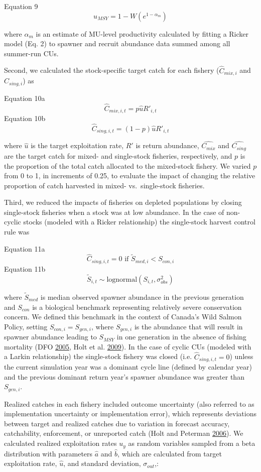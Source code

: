 \documentclass[11pt]{book}
\begin{document}
Equation 9 \[ {u}_{MSY} = 1 - W(e^{1 - \alpha_m})\]

where \(\alpha_m\) is an estimate of MU-level productivity calculated by fitting a Ricker model (Eq. 2) to spawner and recruit abundance data summed among all summer-run CUs.

Second, we calculated the stock-specific target catch for each fishery (\(\hat{C}_{mix,i}\) and \(\hat{C}_{sing,i}\)) as

Equation 10a \[ \hat{C}_{mix,i,t} = p\hat{u}R'_{i,t} \] Equation 10b \[ \hat{C}_{sing,i,t} = (1-p)\hat{u}R'_{i,t} \]

where \(\hat{u}\) is the target exploitation rate, \(R'\) is return abundance, \(\hat{C_{mix}}\) and \(\hat{C_{sing}}\) are the target catch for mixed- and single-stock fisheries, respectively, and \(p\) is the proportion of the total catch allocated to the mixed-stock fishery. We varied \(p\) from 0 to 1, in increments of 0.25, to evaluate the impact of changing the relative proportion of catch harvested in mixed- vs.~single-stock fisheries.

Third, we reduced the impacts of fisheries on depleted populations by closing single-stock fisheries when a stock was at low abundance. In the case of non-cyclic stocks (modeled with a Ricker relationship) the single-stock harvest control rule was

Equation 11a \[ \hat{C}_{sing,i,t} = 0 \text{ if  } \tilde{S}_{med,i} < S_{con,i} \] Equation 11b \[ \tilde{S}_{i,t} \sim \text{lognormal}(S_{i,t}, \sigma^2_{obs}) \]

where \(\tilde{S}_{med}\) is median observed spawner abundance in the previous generation and \(S_{con}\) is a biological benchmark representing relatively severe conservation concern. We defined this benchmark in the context of Canada's Wild Salmon Policy, setting \(S_{con,i} = S_{gen,i}\), where \({S}_{gen,i}\) is the abundance that will result in spawner abundance leading to \({S}_{MSY}\) in one generation in the absence of fishing mortality (DFO \protect\hyperlink{ref-DFO2005}{2005}, Holt et al. \protect\hyperlink{ref-Holt2009}{2009}). In the case of cyclic CUs (modeled with a Larkin relationship) the single-stock fishery was closed (i.e. \(\hat{C}_{sing,i,t} = 0\)) unless the current simulation year was a dominant cycle line (defined by calendar year) and the previous dominant return year's spawner abundance was greater than \({S}_{gen,i}\).

Realized catches in each fishery included outcome uncertainty (also referred to as implementation uncertainty or implementation error), which represents deviations between target and realized catches due to variation in forecast accuracy, catchability, enforcement, or unreported catch (Holt and Peterman \protect\hyperlink{ref-Holt2006}{2006}). We calculated realized exploitation rates \(u_{y}\) as random variables sampled from a beta distribution with parameters \(\hat{a}\) and \(\hat{b}\), which are calculated from target exploitation rate, \(\hat{u}\), and standard deviation, \(\sigma_{out}\),:
\end{document}
